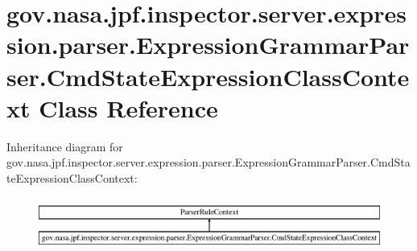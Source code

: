 \hypertarget{classgov_1_1nasa_1_1jpf_1_1inspector_1_1server_1_1expression_1_1parser_1_1_expression_grammar_pa672388ef0800b4a3d173ab7548f6b406}{}\section{gov.\+nasa.\+jpf.\+inspector.\+server.\+expression.\+parser.\+Expression\+Grammar\+Parser.\+Cmd\+State\+Expression\+Class\+Context Class Reference}
\label{classgov_1_1nasa_1_1jpf_1_1inspector_1_1server_1_1expression_1_1parser_1_1_expression_grammar_pa672388ef0800b4a3d173ab7548f6b406}
Inheritance diagram for gov.\+nasa.\+jpf.\+inspector.\+server.\+expression.\+parser.\+Expression\+Grammar\+Parser.\+Cmd\+State\+Expression\+Class\+Context\+:\begin{figure}[H]
\begin{center}
\leavevmode
\includegraphics[height=1.750000cm]{classgov_1_1nasa_1_1jpf_1_1inspector_1_1server_1_1expression_1_1parser_1_1_expression_grammar_pa672388ef0800b4a3d173ab7548f6b406}
\end{center}
\end{figure}
